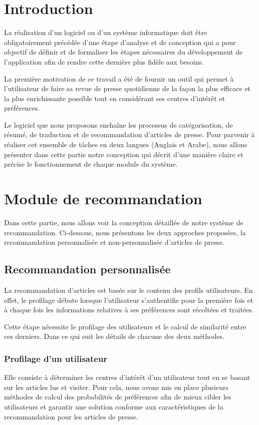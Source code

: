 
\newpage
\section{Introduction}
La réalisation d'un logiciel ou d'un système informatique doit être obligatoirement précédée d'une étape d'analyse et de conception qui a pour objectif de définir et de formaliser les étapes nécessaires du développement de l'application afin de rendre cette dernière plus fidèle aux besoins.

La première motivation de ce travail a été de fournir un outil qui permet à l'utilisateur de faire sa revue de presse quotidienne de la façon la plus efficace et la plus enrichissante possible tout en considérant ses centres d'intérêt et préférences. 

Le logiciel que nous proposons enchaîne les processus de catégorisation, de résumé, de traduction et de recommandation d'articles de presse. Pour parvenir à réaliser cet ensemble de tâches en deux langues (Anglais et Arabe), nous allons présenter dans cette partie notre conception qui décrit d'une manière claire et précise le fonctionnement de chaque module du système. 


\section{Module de recommandation}
Dans cette partie, nous allons voir la conception détaillée de notre système de recommandation. Ci-dessous, nous présentons les deux approches proposées, la recommandation personnalisée et non-personnalisée d'articles de presse.
    \subsection{Recommandation personnalisée\label{personal}}
    La recommandation d'articles est basée sur le contenu des profils utilisateurs. En effet, le profilage débute lorsque l'utilisateur s'authentifie pour la première fois et à chaque fois les informations relatives à ses préférences sont récoltées et traitées.

    Cette étape nécessite le profilage des utilisateurs et le calcul de similarité entre ces derniers. Dans ce qui suit les détails de chacune des deux méthodes.

        \subsubsection{Profilage d'un utilisateur}
        Elle consiste à déterminer les centres d'intérêt d'un utilisateur tout en se basant sur les articles lus et visiter. Pour cela, nous avons mis en place plusieurs méthodes de calcul des probabilités de préférences afin de mieux cibler les utilisateurs et garantir une solution conforme aux caractéristiques de la recommandation pour les articles de presse. 

